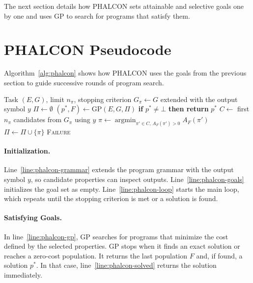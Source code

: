 \documentclass[letterpaper]{article} %
\begin{document}
The next section details how PHALCON sets attainable and selective
goals one by one and uses GP to search for programs that satisfy
them.

\section{PHALCON Pseudocode}
\label{sec:phalcon-pseudocode}

Algorithm~\ref{alg:phalcon} shows how PHALCON uses the goals from
the previous section to guide successive rounds of program search.

\begin{algorithm}[tb]
\caption{PHALCON}
\label{alg:phalcon}
\begin{algorithmic}[1]
\REQUIRE Task \((E,G)\), limit \(n_\pi\), stopping criterion
\STATE \label{line:phalcon-grammar}
  \(G_\pi \gets G\) extended with the output symbol \(y\)
\STATE \label{line:phalcon-goals} \(\Pi \gets \emptyset\)
\label{line:phalcon-loop}
    \STATE \label{line:phalcon-gp} \((p^*,F) \gets \mathrm{GP}(E,G,\Pi)\)
    \STATE \label{line:phalcon-solved}
      \textbf{if} \(p^* \ne \bot\) \textbf{then return} \(p^*\)
    \STATE \label{line:phalcon-candidates}
      \(C \gets\) first \(n_\pi\) candidates from \(G_\pi\) using \(y\)
    \STATE \label{line:phalcon-select} \(\displaystyle\pi \gets
      \mathop{\arg\min}_{\pi'\in C,\,A_F(\pi')>0} A_F(\pi')\)
    \STATE \label{line:phalcon-add} \(\Pi \gets \Pi \cup \{\pi\}\)
\ENDWHILE
\RETURN \label{line:phalcon-failure} \textsc{Failure}
\end{algorithmic}
\end{algorithm}

\paragraph{Initialization.}
Line~\ref{line:phalcon-grammar} extends the program grammar with the
output symbol \(y\), so candidate properties can inspect outputs.
Line~\ref{line:phalcon-goals} initializes the goal set as empty.
Line~\ref{line:phalcon-loop} starts the main loop, which repeats until
the stopping criterion is met or a solution is found.

\paragraph{Satisfying Goals.}
In line~\ref{line:phalcon-gp}, GP searches for programs that minimize
the cost defined by the selected properties. GP stops when it finds
an exact solution or reaches a zero-cost population. It returns the
last population \(F\) and, if found, a solution \(p^*\).
In that case, line~\ref{line:phalcon-solved} returns the solution immediately.
\end{document}

